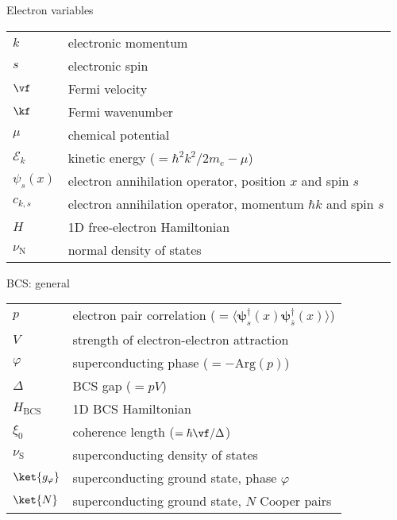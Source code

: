 \vspace{4mm}

{\Large\noindent Electron variables}
\vspace{-.2cm}
\begin{longtable}{ m{5em} m{29em}}
$k$ & electronic momentum \\
$s$ & electronic spin \\
$\vf$ & Fermi velocity \\
$\kf$ & Fermi wavenumber \\
$\mu$ & chemical potential \\
$\mathcal{E}_k$ & kinetic energy ($=\hbar^2 k^2/2 m_e - \mu$) \\
$\psi_{s}(x)$ & electron annihilation operator, position $x$ and spin $s$ \\
$c_{k,s}$ & electron annihilation operator, momentum $\hbar k$ and spin $s$ \\
$H$ & 1D free-electron Hamiltonian \\
$\nu_\mathrm{N}$ & normal density of states \\
\end{longtable}
\vspace{.2cm}

{\Large\noindent BCS: general}
\vspace{-.2cm}
\begin{longtable}{ m{5em} m{29em}}
$p$ & electron pair correlation ($= \langle \boldsymbol{\psi}_s^\dagger(x)\boldsymbol{\psi}_{\overline{s}}^\dagger(x) \rangle$) \\
$V$ & strength of electron-electron attraction \\
$\varphi$ & superconducting phase  ($=-\mathrm{Arg}(p)$)\\
$\Delta$ & BCS gap ($=pV$) \\
$H_\mathrm{BCS}$ & 1D BCS Hamiltonian\\
$\xi_0$ & coherence length ($=\hbar \vf/\Delta$) \\
$\nu_\mathrm{S}$ & superconducting density of states \\
$\ket{g_\varphi}$ & superconducting ground state, phase $\varphi$ \\
$\ket{N}$ & superconducting ground state, $N$ Cooper pairs \\
\end{longtable}
\vspace{.2cm}

